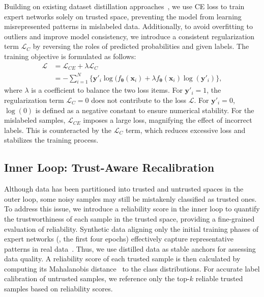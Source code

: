 Building on existing dataset distillation approaches~\cite{cazenavette2022distillation, du2023minimizing, guo2024lossless, liu2024dataset}, we use CE loss to train expert networks solely on trusted space, preventing the model from learning misrepresented patterns in mislabeled data.
Additionally, to avoid overfitting to outliers and improve model consistency, we introduce a consistent regularization term $\mathcal{L}_{C}$ by reversing the roles of predicted probabilities and given labels.  
The training objective is formulated as follows:
\begin{equation}
\begin{aligned}
\mathcal{L} &= \mathcal{L}_{CE} + \lambda \mathcal{L}_{C} \\
&= - \sum_{i=1}^N \{\bm{y}'_i \log(f_{\boldsymbol{\theta}}(\bm{x}_i) + \lambda f_{\boldsymbol{\theta}}(\bm{x}_i) \log(\bm{y}'_i) \},
\end{aligned}
\label{eq6}
\end{equation}
where $\lambda$ is a coefficient to balance the two loss items.
For $\bm{y}'_i = 1$, the regularization term $\mathcal{L}_{C}=0$ does not contribute to the loss $\mathcal{L}$.
For $\bm{y}'_i = 0$, $\log(0)$ is defined as a negative constant to ensure numerical stability.
For the mislabeled samples, $\mathcal{L}_{CE}$ imposes a large loss, magnifying the effect of incorrect labels. 
This is counteracted by the $\mathcal{L}_{C}$ term, which reduces excessive loss and stabilizes the training process. 


\subsection{Inner Loop: Trust-Aware Recalibration}
\label{sec:inner}

Although data has been partitioned into trusted and untrusted spaces in the outer loop, some noisy samples may still be mistakenly classified as trusted ones.
To address this issue, we introduce a reliability score in the inner loop to quantify the trustworthiness of each sample in the trusted space, providing a fine-grained evaluation of reliability.
Synthetic data aligning only the initial training phases of expert networks (\eg, the first four epochs) effectively capture representative patterns in real data~\cite{li2024prioritize, guo2024lossless}.
Thus, we use distilled data as stable anchors for assessing data quality.
A reliability score of each trusted sample is then calculated by computing its Mahalanobis distance~\cite{de2000mahalanobis} to the class distributions. 
For accurate label calibration of untrusted samples, we reference only the top-$k$ reliable trusted samples based on reliability scores.


